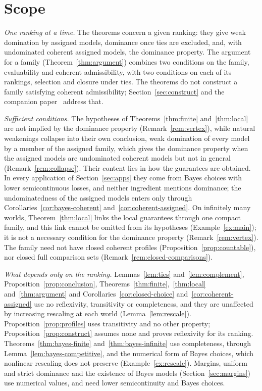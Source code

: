 \documentclass[11pt]{article}
\theoremstyle{definition}
\theoremstyle{remark}
\begin{document}
\section{Scope}\label{sec:scope}
\emph{One ranking at a time.} The theorems concern a given ranking: they give weak domination by assigned models, dominance once ties are excluded, and, with undominated coherent assigned models, the dominance property. The argument for a family (Theorem~\ref{thm:argument}) combines two conditions on the family, evaluability and coherent admissibility, with two conditions on each of its rankings, selection and closure under ties. The theorems do not construct a family satisfying coherent admissibility; Section~\ref{sec:construct} and the companion paper~\cite{KCM} address that.

\emph{Sufficient conditions.} The hypotheses of Theorems~\ref{thm:finite} and~\ref{thm:local} are not implied by the dominance property (Remark~\ref{rem:vertex}), while natural weakenings collapse into their own conclusion, weak domination of every model by a member of the assigned family, which gives the dominance property when the assigned models are undominated coherent models but not in general (Remark~\ref{rem:collapse}). Their content lies in how the guarantees are obtained. In every application of Section~\ref{sec:apps} they come from Bayes choices with lower semicontinuous losses, and neither ingredient mentions dominance; the undominatedness of the assigned models enters only through Corollaries~\ref{cor:bayes-coherent} and~\ref{cor:coherent-assigned}. On infinitely many worlds, Theorem~\ref{thm:local} links the local guarantees through one compact family, and this link cannot be omitted from its hypotheses (Example~\ref{ex:main}); it is not a necessary condition for the dominance property (Remark~\ref{rem:vertex}). The family need not have closed coherent profiles (Proposition~\ref{prop:countable}), nor closed full comparison sets (Remark~\ref{rem:closed-comparisons}).

\emph{What depends only on the ranking.} Lemmas~\ref{lem:ties} and~\ref{lem:complement}, Proposition~\ref{prop:conclusion}, Theorems~\ref{thm:finite},~\ref{thm:local} and~\ref{thm:argument} and Corollaries~\ref{cor:closed-choice} and~\ref{cor:coherent-assigned} use no reflexivity, transitivity or completeness, and they are unaffected by increasing rescaling at each world (Lemma~\ref{lem:rescale}). Proposition~\ref{prop:profiles} uses transitivity and no other property; Proposition~\ref{prop:construct} assumes none and proves reflexivity for its ranking. Theorems~\ref{thm:bayes-finite} and~\ref{thm:bayes-infinite} use completeness, through Lemma~\ref{lem:bayes-competitive}, and the numerical form of Bayes choices, which nonlinear rescaling does not preserve (Example~\ref{ex:rescale}). Margins, uniform and strict dominance and the existence of Bayes models (Section~\ref{sec:margins}) use numerical values, and need lower semicontinuity and Bayes choices.
\end{document}
